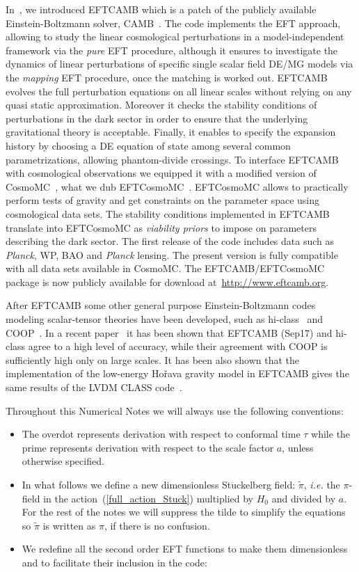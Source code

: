 \documentclass[prd,nofootinbib,showpacs]{revtex4}
\def\ie{{\frenchspacing\it i.e. }}
\begin{document}
{In~\cite{Hu:2013twa,Raveri:2014cka}, we introduced EFTCAMB which is a patch of  the publicly available  Einstein-Boltzmann solver, CAMB~\cite{CAMB,Lewis:1999bs}. The code implements the EFT approach, allowing to study the linear cosmological perturbations  in a model-independent framework via the \textit{pure} EFT procedure, although it ensures to investigate the dynamics of linear perturbations of specific single scalar field DE/MG models via the \textit{mapping} EFT procedure, once the matching is worked out. EFTCAMB evolves the full perturbation equations on all linear scales without relying on any quasi static approximation. Moreover it checks the stability conditions of perturbations  in the dark sector in order to ensure that the underlying gravitational theory is acceptable.
Finally, it enables to specify the expansion history by choosing a DE equation of state among several common parametrizations, allowing phantom-divide crossings.
To interface EFTCAMB with cosmological observations we equipped it with a modified version of 
CosmoMC~\cite{Lewis:2002ah}, what we dub EFTCosmoMC~\cite{Raveri:2014cka}. EFTCosmoMC  allows to practically perform tests of gravity and get constraints on the parameter space using cosmological data sets. The stability conditions implemented in EFTCAMB translate into EFTCosmoMC  as {\it viability priors} to impose  on parameters describing the dark sector. The first release of the code includes data such as \textit{Planck}, WP, BAO and \textit{Planck} lensing. The present version is fully compatible with all data sets available in CosmoMC. The EFTCAMB/EFTCosmoMC package is now publicly available for download at~\url{http://www.eftcamb.org}.

After EFTCAMB some other general purpose Einstein-Boltzmann codes modeling scalar-tensor theories have been developed, such as hi-class~\cite{Zumalacarregui:2016pph} and COOP~\cite{Huang:2015srv}.  In a recent paper~\cite{Bellini:2017avd} it has been shown that EFTCAMB (Sep17) and hi-class  agree to a high level of accuracy, while their agreement with COOP is sufficiently high only on large scales. It has been also shown that the implementation of the low-energy Ho\v rava gravity model in EFTCAMB gives the same results of the LVDM CLASS code~\cite{Blas:2012vn}.

Throughout this Numerical Notes we will always use the following conventions:
\begin{itemize}
\item The overdot represents derivation with respect to conformal time $\tau$ while the prime represents derivation with respect to the scale factor $a$, unless otherwise specified.
\item In what follows we define a new dimensionless St$\ddot{\text{u}}$ckelberg field: $\widetilde{\pi}$,  \ie the $\pi$-field in the action~(\ref{full_action_Stuck}) multiplied by $H_0$ and divided by $a$. For the rest of the notes we will suppress the tilde to simplify the equations so $\widetilde{\pi}$ is written as $\pi$, if there is no confusion.
\item We redefine all the second order EFT functions to make them dimensionless and to facilitate their inclusion in the code: 
%


\end{itemize}}
\end{document}

